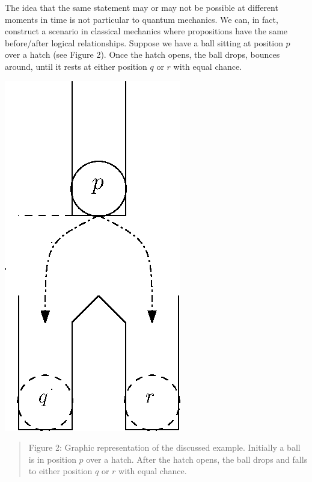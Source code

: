 \documentclass[11pt, executivepaper]{article}
\begin{document}
The idea that the same statement may or may not be possible at different moments in time is not particular to quantum mechanics. We can, in fact, construct a scenario in classical mechanics where propositions have the same before/after logical relationships. Suppose we have a ball sitting at position $p$ over a hatch (see Figure 2). Once the hatch opens, the ball drops, bounces around, until it rests at either position $q$ or $r$ with equal chance.


\begin{center}
\includegraphics[scale=.8]{Ball.eps}
\begin{quote}
\small{Figure 2: Graphic representation of the discussed example.  Initially a ball is in position $p$ over a hatch.  After the hatch opens, the ball drops and falls to either position $q$ or $r$ with equal chance.}
\end{quote}
\end{center}
\end{document}
